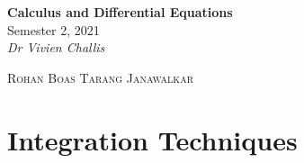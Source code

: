 \documentclass{article}
\date{}
\newcommand{\className}{Calculus and Differential Equations}
\newcommand{\classTime}{Semester 2, 2021}
\newcommand{\classInstructorName}{Dr Vivien Challis}
\begin{document}
\begin{titlepage}
    \vspace*{\fill}
    \begin{center}
        \LARGE{\textbf{\className}}
        \texorpdfstring{\\}{ }
        \texorpdfstring{\vspace{0.1in}}{ }
        \normalsize{\classTime}
        \texorpdfstring{\\}{ }
        \texorpdfstring{\vspace{0.2in}}{ }
        \normalsize\textit{\classInstructorName}
        \texorpdfstring{\\}{ }
    \end{center}
    \begin{center}
        \textsc{Rohan Boas \quad\quad Tarang Janawalkar}
\end{center}
    \vspace*{\fill}
    \doclicenseThis
    \thispagestyle{empty}
\end{titlepage}
\newpage

\tableofcontents
\newpage

\section{Integration Techniques}
\end{document}
